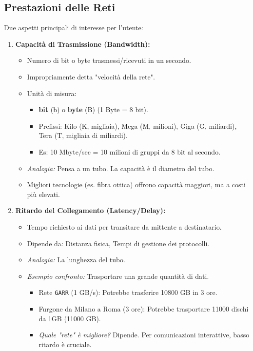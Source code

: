\subsection{Prestazioni delle Reti}
Due aspetti principali di interesse per l'utente:
\begin{enumerate}
    \item \textbf{Capacità di Trasmissione (Bandwidth):}
    \begin{itemize}
        \item Numero di bit o byte trasmessi/ricevuti in un secondo.
        \item Impropriamente detta "velocità della rete".
        \item Unità di misura:
        \begin{itemize}
            \item \textbf{bit} (b) o \textbf{byte} (B) (1 Byte = 8 bit).
            \item Prefissi: Kilo (K, migliaia), Mega (M, milioni), Giga (G, miliardi), Tera (T, migliaia di miliardi).
            \item Es: 10 Mbyte/sec = 10 milioni di gruppi da 8 bit al secondo.
        \end{itemize}
        \item \textit{Analogia:} Pensa a un tubo. La capacità è il diametro del tubo.
        \item Migliori tecnologie (es. fibra ottica) offrono capacità maggiori, ma a costi più elevati.
    \end{itemize}
    \item \textbf{Ritardo del Collegamento (Latency/Delay):}
    \begin{itemize}
        \item Tempo richiesto ai dati per transitare da mittente a destinatario.
        \item Dipende da: Distanza fisica, Tempi di gestione dei protocolli.
        \item \textit{Analogia:} La lunghezza del tubo.
        \item \textit{Esempio confronto:} Trasportare una grande quantità di dati.
        \begin{itemize}
            \item Rete \texttt{GARR} (1 GB/s): Potrebbe trasferire 10800 GB in 3 ore.
            \item Furgone da Milano a Roma (3 ore): Potrebbe trasportare 11000 dischi da 1GB (11000 GB).
            \item \textit{Quale "rete" è migliore?} Dipende. Per comunicazioni interattive, basso ritardo è cruciale.
        \end{itemize}
    \end{itemize}
\end{enumerate}
